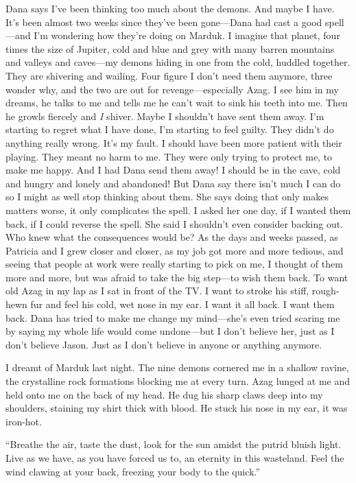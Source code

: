 \documentclass[
]{article}
\begin{document}
Dana says I've been thinking too much about the demons. And maybe I
have. It's been almost two weeks since they've been gone---Dana had cast
a good spell---and I'm wondering how they're doing on Marduk. I imagine
that planet, four times the size of Jupiter, cold and blue and grey with
many barren mountains and valleys and caves---my demons hiding in one
from the cold, huddled together. They are shivering and wailing. Four
figure I don't need them anymore, three wonder why, and the two are out
for revenge---especially Azag. I see him in my dreams, he talks to me
and tells me he can't wait to sink his teeth into me. Then he growls
fiercely and \emph{I} shiver. Maybe I shouldn't have sent them away. I'm
starting to regret what I have done, I'm starting to feel guilty. They
didn't do anything really wrong. It's my fault. I should have been more
patient with their playing. They meant no harm to me. They were only
trying to protect me, to make me happy. And I had Dana send them away! I
should be in the cave, cold and hungry and lonely and abandoned! But
Dana say there isn't much I can do so I might as well stop thinking
about them. She says doing that only makes matters worse, it only
complicates the spell. I asked her one day, if I wanted them back, if I
could reverse the spell. She said I shouldn't even consider backing out.
Who knew what the consequences would be? As the days and weeks passed,
as Patricia and I grew closer and closer, as my job got more and more
tedious, and seeing that people at work were really starting to pick on
me, I thought of them more and more, but was afraid to take the big
step---to wish them back. To want old Azag in my lap as I sat in front
of the TV. I want to stroke his stiff, rough-hewn fur and feel his cold,
wet nose in my ear. I want it all back. I want them back. Dana has tried
to make me change my mind---she's even tried scaring me by saying my
whole life would come undone---but I don't believe her, just as I don't
believe Jason. Just as I don't believe in anyone or anything anymore.

I dreamt of Marduk last night. The nine demons cornered me in a shallow
ravine, the crystalline rock formations blocking me at every turn. Azag
lunged at me and held onto me on the back of my head. He dug his sharp
claws deep into my shoulders, staining my shirt thick with blood. He
stuck his nose in my ear, it was iron-hot.

``Breathe the air, taste the dust, look for the sun amidst the putrid
bluish light. Live as we have, as you have forced us to, an eternity in
this wasteland. Feel the wind clawing at your back, freezing your body
to the quick.''
\end{document}
